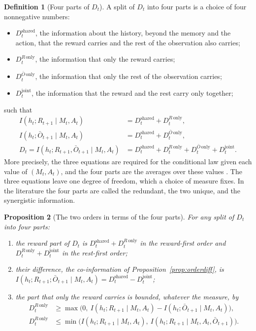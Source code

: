 \documentclass{article}
\newtheorem{proposition}{Proposition}[section]
\theoremstyle{definition}
\newtheorem{definition}[proposition]{Definition}
\theoremstyle{remark}
\newcommand{\Ob}{\bar O}
\begin{document}
\begin{definition}[Four parts of $D_t$]\label{def:pid}
A split of $D_t$ into four parts is a choice of four nonnegative numbers:
\begin{itemize}
\item $D^{\mathrm{shared}}_t$, the information about the history, beyond the memory and the action, that the reward carries and the rest of the observation also carries;
\item $D^{R\,\mathrm{only}}_t$, the information that only the reward carries;
\item $D^{\Ob\,\mathrm{only}}_t$, the information that only the rest of the observation carries;
\item $D^{\mathrm{joint}}_t$, the information that the reward and the rest carry only together;
\end{itemize}
such that
\begin{align*}
I(h_t;R_{t+1}\mid M_t,A_t)&=D^{\mathrm{shared}}_t+D^{R\,\mathrm{only}}_t,\\
I(h_t;\Ob_{t+1}\mid M_t,A_t)&=D^{\mathrm{shared}}_t+D^{\Ob\,\mathrm{only}}_t,\\
D_t=I(h_t;R_{t+1},\Ob_{t+1}\mid M_t,A_t)&=D^{\mathrm{shared}}_t+D^{R\,\mathrm{only}}_t+D^{\Ob\,\mathrm{only}}_t+D^{\mathrm{joint}}_t.
\end{align*}
More precisely, the three equations are required for the conditional law given each value of $(M_t,A_t)$, and the four parts are the averages over these values \citep[Definition~3]{matthias2025novel}. The three equations leave one degree of freedom, which a choice of measure fixes. In the literature the four parts are called the redundant, the two unique, and the synergistic information.
\end{definition}

\begin{proposition}[The two orders in terms of the four parts]\label{prop:pid}
For any split of $D_t$ into four parts:
\begin{enumerate}
\item[(a)] the reward part of $D_t$ is $D^{\mathrm{shared}}_t+D^{R\,\mathrm{only}}_t$ in the reward-first order and $D^{R\,\mathrm{only}}_t+D^{\mathrm{joint}}_t$ in the rest-first order;
\item[(b)] their difference, the co-information of Proposition~\ref{prop:orderdiff}, is $I(h_t;R_{t+1};\Ob_{t+1}\mid M_t,A_t)=D^{\mathrm{shared}}_t-D^{\mathrm{joint}}_t$;
\item[(c)] the part that only the reward carries is bounded, whatever the measure, by
\begin{align*}
D^{R\,\mathrm{only}}_t&\ge\max\big(0,\ I(h_t;R_{t+1}\mid M_t,A_t)-I(h_t;\Ob_{t+1}\mid M_t,A_t)\big),\\
D^{R\,\mathrm{only}}_t&\le\min\big(I(h_t;R_{t+1}\mid M_t,A_t),\ I(h_t;R_{t+1}\mid M_t,A_t,\Ob_{t+1})\big).
\end{align*}
\end{enumerate}
\end{proposition}
\end{document}

